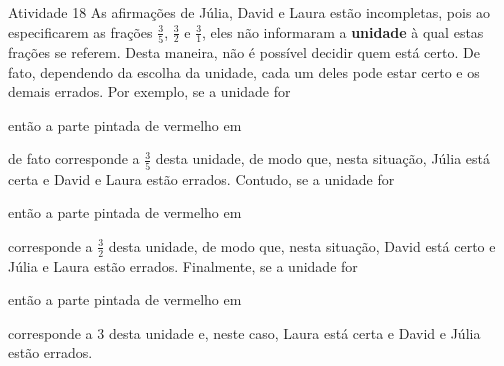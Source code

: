 \begin{multicols}{2}
\begin{resposta*}{Atividade 18}
  As afirmações de Júlia, David e Laura estão incompletas, pois ao especificarem as frações   $\frac{3}{5}$,   $\frac{3}{2}$ e   $\frac{3}{1}$, eles não informaram a   {\bf unidade}   à qual estas frações se referem. Desta maneira, não é possível decidir quem está certo. De fato, dependendo da escolha da unidade, cada um deles pode estar certo e os demais errados. Por exemplo, se a unidade for
\begin{center}
\end{center}
então a parte pintada de vermelho em
\begin{center}
\end{center}
de fato corresponde a   $\frac{3}{5}$ desta unidade, de modo que, nesta situação, Júlia está certa e David e Laura estão errados. Contudo, se a unidade for
\begin{center}
\end{center}
então a parte pintada de vermelho em
\begin{center}
\end{center}
  corresponde a   $\frac{3}{2}$ desta unidade,  de modo que, nesta situação, David está certo e Júlia e Laura estão errados. Finalmente, se a unidade for
\begin{center}
\end{center}
então a parte pintada de vermelho em
\begin{center}
\end{center}
  corresponde a   $3$ desta unidade e, neste caso, Laura está certa e David e Júlia estão errados.
\end{resposta*}


\end{multicols}

